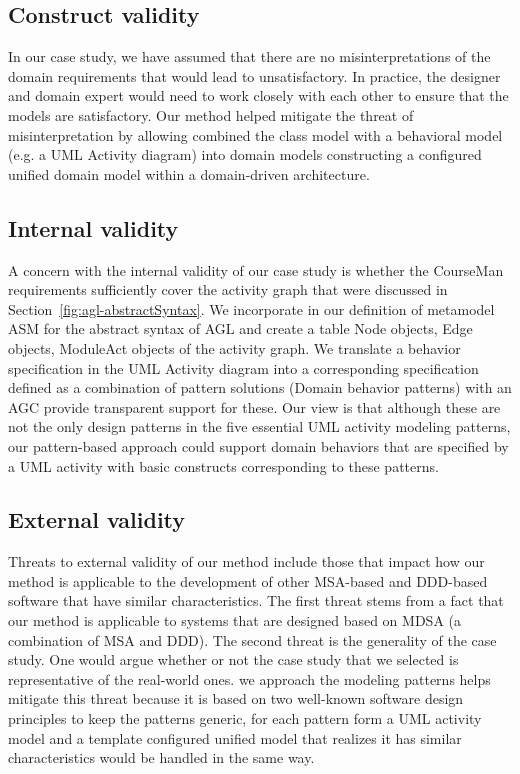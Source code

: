 \subsection{Construct validity}
In our case study, we have assumed that there are no misinterpretations of the domain requirements that would lead to unsatisfactory. In practice, the designer and domain expert would need to work closely with each other to ensure that the models are satisfactory.
Our method helped mitigate the threat of misinterpretation by allowing combined the class model with a behavioral model (e.g. a UML Activity
diagram) into domain models constructing a configured unified domain model within a domain-driven architecture.
%
\subsection{Internal validity}
A concern with the internal validity of our case study is whether the CourseMan requirements sufficiently cover the activity graph that were discussed in Section~\ref{fig:agl-abstractSyntax}. We incorporate in our definition of  metamodel ASM for the abstract syntax of AGL and create a table Node objects, Edge objects, ModuleAct objects of the activity graph.  We translate a behavior specification in the UML Activity diagram into a corresponding specification defined as a combination of pattern solutions (Domain behavior patterns) with an AGC provide transparent support for these. Our view is that although these are not the only design patterns in the five essential UML activity modeling patterns, our pattern-based approach could support domain behaviors that are specified by a UML activity with basic constructs corresponding to these patterns.
%
\subsection{External validity}
Threats to external validity of our method include those that impact how our method is applicable to the development of other MSA-based and DDD-based software that have similar characteristics. The first threat stems from a fact that our method is applicable to systems that are designed based on MDSA (a combination of MSA and DDD). The second threat is the generality of the case study. One would argue whether or not the case study that we selected is representative of the real-world ones.
%
we approach the modeling patterns helps mitigate this threat because it is based on two well-known software design principles to keep the patterns generic, for each pattern form a UML activity model and a template configured unified model that realizes it has similar characteristics would be handled in the same way.
